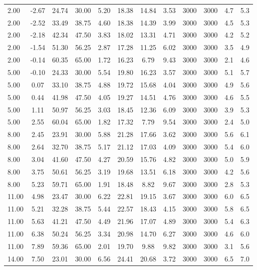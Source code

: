 \documentclass[english]{SPFShortReport}
\begin{document}
\begin{table}[!ht]
\begin{small}
\begin{center}
{\begin{tabular}{l | c c c c c c c c c c c }
2.00 & -2.67 & 24.74 & 30.00 & 5.20 & 18.38 & 14.84 & 3.53 & 3000 & 3000 & 4.7 & 5.3\\ 
2.00 & -2.52 & 33.49 & 38.75 & 4.60 & 18.38 & 14.39 & 3.99 & 3000 & 3000 & 4.5 & 5.3\\ 
2.00 & -2.18 & 42.34 & 47.50 & 3.83 & 18.02 & 13.31 & 4.71 & 3000 & 3000 & 4.2 & 5.2\\ 
2.00 & -1.54 & 51.30 & 56.25 & 2.87 & 17.28 & 11.25 & 6.02 & 3000 & 3000 & 3.5 & 4.9\\ 
2.00 & -0.14 & 60.35 & 65.00 & 1.72 & 16.23 & 6.79 & 9.43 & 3000 & 3000 & 2.1 & 4.6\\ 
5.00 & -0.10 & 24.33 & 30.00 & 5.54 & 19.80 & 16.23 & 3.57 & 3000 & 3000 & 5.1 & 5.7\\ 
5.00 & 0.07 & 33.10 & 38.75 & 4.88 & 19.72 & 15.68 & 4.04 & 3000 & 3000 & 4.9 & 5.6\\ 
5.00 & 0.44 & 41.98 & 47.50 & 4.05 & 19.27 & 14.51 & 4.76 & 3000 & 3000 & 4.6 & 5.5\\ 
5.00 & 1.11 & 50.97 & 56.25 & 3.03 & 18.45 & 12.36 & 6.09 & 3000 & 3000 & 3.9 & 5.3\\ 
5.00 & 2.55 & 60.04 & 65.00 & 1.82 & 17.32 & 7.79 & 9.54 & 3000 & 3000 & 2.4 & 5.0\\ 
8.00 & 2.45 & 23.91 & 30.00 & 5.88 & 21.28 & 17.66 & 3.62 & 3000 & 3000 & 5.6 & 6.1\\ 
8.00 & 2.64 & 32.70 & 38.75 & 5.17 & 21.12 & 17.03 & 4.09 & 3000 & 3000 & 5.4 & 6.0\\ 
8.00 & 3.04 & 41.60 & 47.50 & 4.27 & 20.59 & 15.76 & 4.82 & 3000 & 3000 & 5.0 & 5.9\\ 
8.00 & 3.75 & 50.61 & 56.25 & 3.19 & 19.68 & 13.51 & 6.18 & 3000 & 3000 & 4.2 & 5.6\\ 
8.00 & 5.23 & 59.71 & 65.00 & 1.91 & 18.48 & 8.82 & 9.67 & 3000 & 3000 & 2.8 & 5.3\\ 
11.00 & 4.98 & 23.47 & 30.00 & 6.22 & 22.81 & 19.15 & 3.67 & 3000 & 3000 & 6.0 & 6.5\\ 
11.00 & 5.21 & 32.28 & 38.75 & 5.44 & 22.57 & 18.43 & 4.15 & 3000 & 3000 & 5.8 & 6.5\\ 
11.00 & 5.63 & 41.21 & 47.50 & 4.49 & 21.96 & 17.07 & 4.89 & 3000 & 3000 & 5.4 & 6.3\\ 
11.00 & 6.38 & 50.24 & 56.25 & 3.34 & 20.98 & 14.70 & 6.27 & 3000 & 3000 & 4.6 & 6.0\\ 
11.00 & 7.89 & 59.36 & 65.00 & 2.01 & 19.70 & 9.88 & 9.82 & 3000 & 3000 & 3.1 & 5.6\\ 
14.00 & 7.50 & 23.01 & 30.00 & 6.56 & 24.41 & 20.68 & 3.72 & 3000 & 3000 & 6.5 & 7.0\\ 

\end{tabular}}
\end{center}
\end{small}
\end{table}
\end{document}
